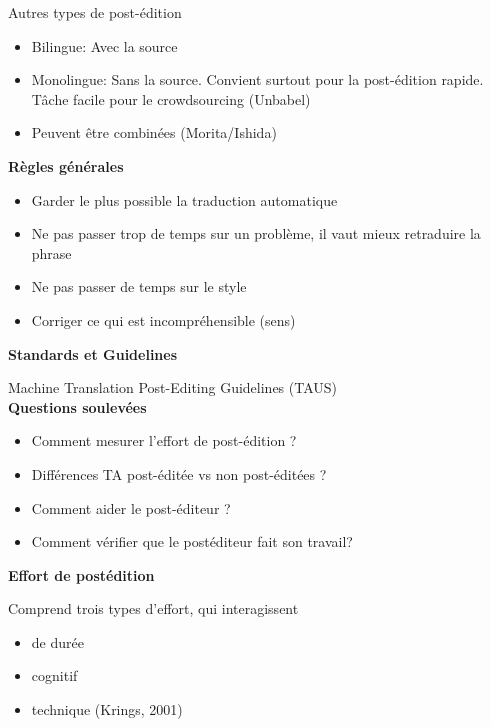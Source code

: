 Autres types de post-édition

\begin{itemize}
    \item Bilingue: Avec la source
    \item Monolingue: Sans la source. Convient surtout pour la post-édition rapide. Tâche facile pour le crowdsourcing (Unbabel)
    \item Peuvent être combinées (Morita/Ishida)\\
\end{itemize}

\newpage

\textbf{Règles générales}

\begin{itemize}
    \item Garder le plus possible la traduction automatique
    \item Ne pas passer trop de temps sur un problème, il vaut mieux retraduire la phrase
    \item Ne pas passer de temps sur le style
    \item Corriger ce qui est incompréhensible (sens)\\
\end{itemize}

\textbf{Standards et Guidelines}

Machine Translation Post-Editing Guidelines (TAUS)\\

\textbf{Questions soulevées}

\begin{itemize}
    \item Comment mesurer l'effort de post-édition ?
    \item Différences TA post-éditée vs non post-éditées ?
    \item Comment aider le post-éditeur ?
    \item Comment vérifier que le postéditeur fait son travail?\\
\end{itemize}

\textbf{Effort de postédition}

Comprend trois types d'effort, qui interagissent

\begin{itemize}
    \item de durée
    \item cognitif
    \item technique (Krings, 2001)\\
\end{itemize}


